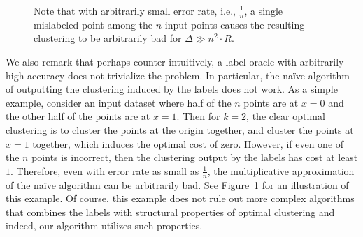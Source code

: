 \documentclass[11pt]{article}
\newcommand{\namedref}[2]{\hyperref[#2]{#1~\ref*{#2}}}
\newcommand{\figlab}[1]{\label{fig:#1}}
\newcommand{\figref}[1]{\namedref{Figure}{fig:#1}}
\begin{document}
\begin{figure}[!htb]
\centering
{}
\caption{Note that with arbitrarily small error rate, i.e., $\frac{1}{n}$, a single mislabeled point among the $n$ input points causes the resulting clustering to be arbitrarily bad for $\Delta\gg n^2\cdot R$.}
\figlab{fig:aug:bad}
\end{figure}

We also remark that perhaps counter-intuitively, a label oracle with arbitrarily high accuracy does not trivialize the problem. 
In particular, the na\"{i}ve algorithm of outputting the clustering induced by the labels does not work. 
As a simple example, consider an input dataset where half of the $n$ points are at $x=0$ and the other half of the points are at $x=1$. 
Then for $k=2$, the clear optimal clustering is to cluster the points at the origin together, and cluster the points at $x=1$ together, which induces the optimal cost of zero. 
However, if even one of the $n$ points is incorrect, then the clustering output by the labels has cost at least $1$. 
Therefore, even with error rate as small as $\frac{1}{n}$, the multiplicative approximation of the na\"{i}ve algorithm can be arbitrarily bad. 
See \figref{fig:aug:bad} for an illustration of this example. 
Of course, this example does not rule out more complex algorithms that combines the labels with structural properties of optimal clustering and indeed, our algorithm utilizes such properties. 
\end{document}
